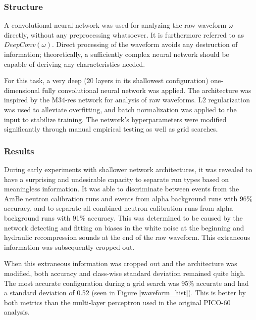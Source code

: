 \documentclass[10pt]{article}
\begin{document}
\subsubsection{Structure}

A convolutional neural network was used for analyzing the raw waveform $\omega$ directly, without any preprocessing whatsoever. It is furthermore referred to as $DeepConv(\omega)$. Direct processing of the waveform avoids any destruction of information; theoretically, a sufficiently complex neural network should be capable of deriving any characteristics needed.

For this task, a very deep (20 layers in its shallowest configuration) one-dimensional fully convolutional neural network was applied. The architecture was inspired by the M34-res network \cite{verydeepconvnets} for analysis of raw waveforms. L2 regularization was used to alleviate overfitting, and batch normalization was applied to the input to stabilize training. The network's hyperparameters were modified significantly through manual empirical testing as well as grid searches.

\subsubsection{Results}

During early experiments with shallower network architectures, it was revealed to have a surprising and undesirable capacity to separate run types based on meaningless information. It was able to discriminate between events from the AmBe neutron calibration runs and events from alpha background runs with 96\% accuracy, and to separate all combined neutron calibration runs from alpha background runs with 91\% accuracy. This was determined to be caused by the network detecting and fitting on biases in the white noise at the beginning and hydraulic recompression sounds at the end of the raw waveform. This extraneous information was subsequently cropped out.

When this extraneous information was cropped out and the architecture was modified, both accuracy and class-wise standard deviation remained quite high. The most accurate configuration during a grid search was 95\% accurate and had a standard deviation of 0.52 (seen in Figure \ref{waveform_hist}). This is better by both metrics than the multi-layer perceptron used in the original PICO-60 analysis.
\end{document}

